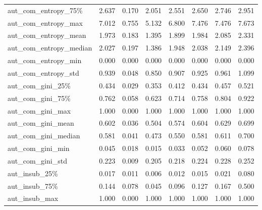 \begin{table}
\begin{tabular}{lrrrrrrr}
aut\_com\_entropy\_75\%    &       2.637 &      0.170 &    2.051 &       2.551 &       2.650 &       2.746 &       2.951 \\
aut\_com\_entropy\_max    &       7.012 &      0.755 &    5.132 &       6.800 &       7.476 &       7.476 &       7.673 \\
aut\_com\_entropy\_mean   &       1.973 &      0.183 &    1.395 &       1.899 &       1.984 &       2.085 &       2.331 \\
aut\_com\_entropy\_median &       2.027 &      0.197 &    1.386 &       1.948 &       2.038 &       2.149 &       2.396 \\
aut\_com\_entropy\_min    &       0.000 &      0.000 &    0.000 &       0.000 &       0.000 &       0.000 &       0.000 \\
aut\_com\_entropy\_std    &       0.939 &      0.048 &    0.850 &       0.907 &       0.925 &       0.961 &       1.099 \\
aut\_com\_gini\_25\%       &       0.434 &      0.029 &    0.353 &       0.412 &       0.434 &       0.457 &       0.521 \\
aut\_com\_gini\_75\%       &       0.762 &      0.058 &    0.623 &       0.714 &       0.758 &       0.804 &       0.922 \\
aut\_com\_gini\_max       &       1.000 &      0.000 &    1.000 &       1.000 &       1.000 &       1.000 &       1.000 \\
aut\_com\_gini\_mean      &       0.602 &      0.036 &    0.504 &       0.574 &       0.604 &       0.629 &       0.699 \\
aut\_com\_gini\_median    &       0.581 &      0.041 &    0.473 &       0.550 &       0.581 &       0.611 &       0.700 \\
aut\_com\_gini\_min       &       0.045 &      0.018 &    0.015 &       0.033 &       0.052 &       0.060 &       0.078 \\
aut\_com\_gini\_std       &       0.223 &      0.009 &    0.205 &       0.218 &       0.224 &       0.228 &       0.252 \\
aut\_insub\_25\%          &       0.017 &      0.011 &    0.006 &       0.012 &       0.015 &       0.021 &       0.080 \\
aut\_insub\_75\%          &       0.144 &      0.078 &    0.045 &       0.096 &       0.127 &       0.167 &       0.500 \\
aut\_insub\_max          &       1.000 &      0.000 &    1.000 &       1.000 &       1.000 &       1.000 &       1.000 \\

\end{tabular}
\end{table}
